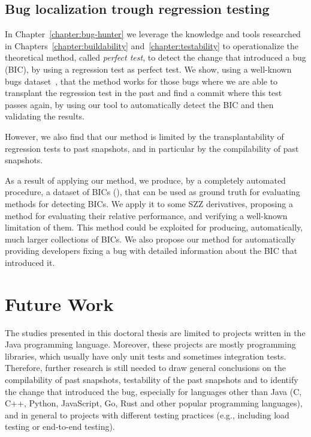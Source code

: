 
\subsection{Bug localization trough regression testing}

In Chapter~\ref{chapter:bug-hunter} we leverage the knowledge and tools researched in Chapters~\ref{chapter:buildability} and~\ref{chapter:testability} to operationalize the theoretical method, called \emph{perfect test}, to detect the change that introduced a bug (BIC), by using a regression test as perfect test. We show, using a well-known bugs dataset~\cite{just2014defects4j}, that the method works for those bugs where we are able to transplant the regression test in the past and find a commit where this test passes again, by using our tool to automatically detect the BIC and then validating the results. 

However, we also find that our method is limited by the transplantability of regression tests to past snapshots, and in particular by the compilability of past snapshots.

As a result of applying our method, we produce, by a completely automated procedure, a dataset of BICs (\datasetName), that can be used as ground truth for evaluating methods for detecting BICs. 
We apply it to some SZZ derivatives, proposing a method for evaluating their relative performance, and verifying a well-known limitation of them. 
This method could be exploited for producing, automatically, much larger collections of BICs. 
We also propose our method for automatically providing developers fixing a bug with detailed information about the BIC that introduced it.

\section{Future Work}
\label{sec:future-work}

The studies presented in this doctoral thesis are limited to projects written in the Java programming language. Moreover, these projects are mostly programming libraries, which usually have only unit tests and sometimes integration tests.
Therefore, further research is still needed to draw general conclusions on the compilability of past snapshots, testability of the past snapshots and to identify the change that introduced the bug, especially for languages other than Java (C, C++, Python, JavaScript, Go, Rust and other popular programming languages), and in general to projects with different testing practices (e.g., including load testing or end-to-end testing).

